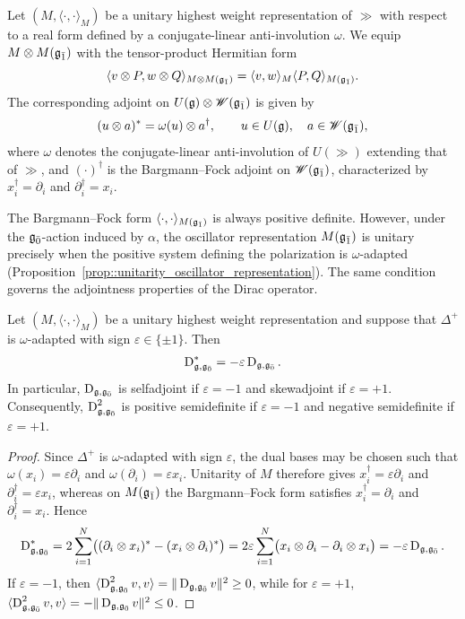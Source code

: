 Let $(M,\langle\cdot,\cdot\rangle_M)$ be a unitary highest weight
representation of $\gg$ with respect to a real form defined by a
conjugate-linear anti-involution $\omega$. We equip $M\otimes M({\mathfrak{g}_{\bar{1}}})$ with the tensor-product Hermitian form
\begin{equation}
 \langle v\otimes P,w\otimes Q\rangle_{M\otimes M({\mathfrak{g}_{\bar{1}}})}
 =
 \langle v,w\rangle_M
 \langle P,Q\rangle_{M({\mathfrak{g}_{\bar{1}}})}.
\end{equation}
The corresponding adjoint on $U({\mathfrak{g}})\otimes\mathscr W({\mathfrak{g}_{\bar{1}}})$ is given by
\begin{equation}
 (u\otimes a)^{\ast}
 =
 \omega(u)\otimes a^{\dagger},
 \qquad
 u\in U({\mathfrak{g}}),\quad a\in\mathscr W({\mathfrak{g}_{\bar{1}}}),
\end{equation}
where $\omega$ denotes the conjugate-linear anti-involution of $U(\gg)$
extending that of $\gg$, and $(\cdot)^{\dagger}$ is the Bargmann--Fock
adjoint on $\mathscr W({\mathfrak{g}_{\bar{1}}})$, characterized by
$x_i^{\dagger}=\partial_i$ and $\partial_i^{\dagger}=x_i$.

The Bargmann--Fock form $\langle\cdot,\cdot\rangle_{M({\mathfrak{g}_{\bar{1}}})}$ is always
positive definite. However, under the ${\mathfrak{g}_{\bar{0}}}$-action induced by $\alpha$,
the oscillator representation $M({\mathfrak{g}_{\bar{1}}})$ is unitary precisely when the positive
system defining the polarization is $\omega$-adapted (Proposition~\ref{prop::unitarity_oscillator_representation}). The same
condition governs the adjointness properties of the Dirac operator.

\begin{theorem}\label{thm::Dirac_adjointness}
 Let $(M,\langle\cdot,\cdot\rangle_M)$ be a unitary highest weight
 representation and suppose that $\Delta^{+}$ is $\omega$-adapted with
 sign $\varepsilon\in\{\pm1\}$. Then
 \[
  \operatorname{D}_{{\mathfrak{g}},{\mathfrak{g}_{\bar{0}}}}^{\ast}
  =
  -\varepsilon\operatorname{D}_{{\mathfrak{g}},{\mathfrak{g}_{\bar{0}}}}.
 \]
 In particular, $\operatorname{D}_{{\mathfrak{g}},{\mathfrak{g}_{\bar{0}}}}$ is selfadjoint if
 $\varepsilon=-1$ and skewadjoint if $\varepsilon=+1$. Consequently,
 $\operatorname{D}_{{\mathfrak{g}},{\mathfrak{g}_{\bar{0}}}}^{2}$ is positive semidefinite if
 $\varepsilon=-1$ and negative semidefinite if $\varepsilon=+1$.
\end{theorem}

\begin{proof}
 Since $\Delta^{+}$ is $\omega$-adapted with sign $\varepsilon$, the
 dual bases may be chosen such that
 $\omega(x_i)=\varepsilon\partial_i$ and
 $\omega(\partial_i)=\varepsilon x_i$. Unitarity of $M$ therefore gives
 $x_i^{\dagger}=\varepsilon\partial_i$ and
 $\partial_i^{\dagger}=\varepsilon x_i$, whereas on $M({\mathfrak{g}_{\bar{1}}})$ the
 Bargmann--Fock form satisfies $x_i^{\dagger}=\partial_i$ and
 $\partial_i^{\dagger}=x_i$. Hence
 \begin{equation*}
  \operatorname{D}_{{\mathfrak{g}},{\mathfrak{g}_{\bar{0}}}}^{\ast}
  =
  2\sum_{i=1}^{N}
  \bigl(
  (\partial_i\otimes x_i)^{\ast}
  -
  (x_i\otimes\partial_i)^{\ast}
  \bigr)=
  2\varepsilon\sum_{i=1}^{N}
  \bigl(
  x_i\otimes\partial_i
  -
  \partial_i\otimes x_i
  \bigr)
  =
  -\varepsilon\operatorname{D}_{{\mathfrak{g}},{\mathfrak{g}_{\bar{0}}}}.
 \end{equation*}
 If $\varepsilon=-1$, then
 $\langle\operatorname{D}_{{\mathfrak{g}},{\mathfrak{g}_{\bar{0}}}}^{2}v,v\rangle
 =\|\operatorname{D}_{{\mathfrak{g}},{\mathfrak{g}_{\bar{0}}}}v\|^{2}\geq0$, while for $\varepsilon=+1$, $\langle\operatorname{D}_{{\mathfrak{g}},{\mathfrak{g}_{\bar{0}}}}^{2}v,v\rangle
  =
  -\|\operatorname{D}_{{\mathfrak{g}},{\mathfrak{g}_{\bar{0}}}}v\|^{2}
  \leq0$.
\end{proof}


